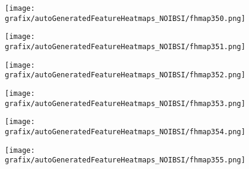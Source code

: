 \hspace{\hsp} 
\begin{subfigure}{\wid\textwidth} 
    \centering 
    \caption{\tiny \sffamily {}} 
    \vspace{\vsp} 
    \texttt{[image: grafix/autoGeneratedFeatureHeatmaps\_NOIBSI/fhmap350.png]} 
\end{subfigure} 
\hspace{\hsp} 
\begin{subfigure}{\wid\textwidth} 
    \centering 
    \caption{\tiny \sffamily {}} 
    \vspace{\vsp} 
    \texttt{[image: grafix/autoGeneratedFeatureHeatmaps\_NOIBSI/fhmap351.png]} 
\end{subfigure} 
\hspace{\hsp} 
\begin{subfigure}{\wid\textwidth} 
    \centering 
    \caption{\tiny \sffamily {}} 
    \vspace{\vsp} 
    \texttt{[image: grafix/autoGeneratedFeatureHeatmaps\_NOIBSI/fhmap352.png]} 
\end{subfigure} 
\hspace{\hsp} 
\begin{subfigure}{\wid\textwidth} 
    \centering 
    \caption{\tiny \sffamily {}} 
    \vspace{\vsp} 
    \texttt{[image: grafix/autoGeneratedFeatureHeatmaps\_NOIBSI/fhmap353.png]} 
\end{subfigure} 
\hspace{\hsp} 
\begin{subfigure}{\wid\textwidth} 
    \centering 
    \caption{\tiny \sffamily {}} 
    \vspace{\vsp} 
    \texttt{[image: grafix/autoGeneratedFeatureHeatmaps\_NOIBSI/fhmap354.png]} 
\end{subfigure} 
\hspace{\hsp} 
\begin{subfigure}{\wid\textwidth} 
    \centering 
    \caption{\tiny \sffamily {}} 
    \vspace{\vsp} 
    \texttt{[image: grafix/autoGeneratedFeatureHeatmaps\_NOIBSI/fhmap355.png]} 
\end{subfigure} 
\hspace{\hsp} 
